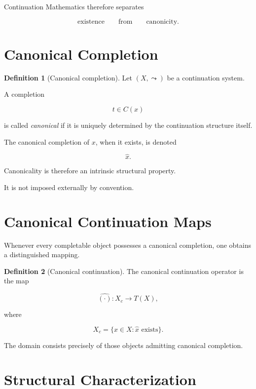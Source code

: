 \documentclass[13pt,openany]{book}
\theoremstyle{plain}
\theoremstyle{definition}
\newtheorem{definition}{Definition}[chapter]
\begin{document}
Continuation Mathematics therefore separates

\[
\text{existence}
\qquad\text{from}\qquad
\text{canonicity}.
\]


\section{Canonical Completion}

\begin{definition}[Canonical completion]
Let $(X,\leadsto)$ be a continuation system.

A completion

\[
t\in C(x)
\]

is called \emph{canonical} if it is uniquely determined by the continuation
structure itself.

The canonical completion of $x$, when it exists, is denoted

\[
\widehat{x}.
\]
\end{definition}

Canonicality is therefore an intrinsic structural property.

It is not imposed externally by convention.


\section{Canonical Continuation Maps}

Whenever every completable object possesses a canonical completion, one obtains
a distinguished mapping.

\begin{definition}[Canonical continuation]
The canonical continuation operator is the map

\[
\widehat{(\cdot)}:
X_c
\longrightarrow
T(X),
\]

where

\[
X_c
=
\{
x\in X:
\widehat{x}
\text{ exists}
\}.
\]
\end{definition}

The domain consists precisely of those objects admitting canonical completion.


\section{Structural Characterization}
\end{document}
